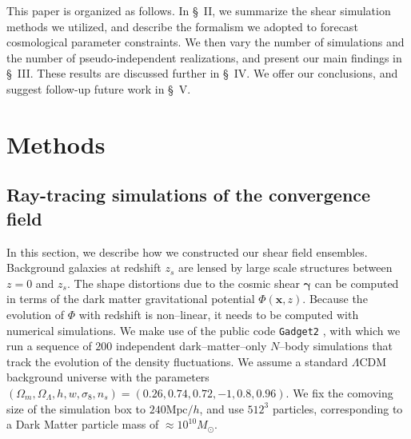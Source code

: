 \documentclass[reprint,aps,prd,superscriptaddress,showkeys,showpacs]{revtex4-1}
\newcommand{\bb}[1]{\mathbf{#1}}
\begin{document}
This paper is organized as follows.  In \S~II, we summarize the shear
simulation methods we utilized, and describe the formalism we adopted
to forecast cosmological parameter constraints. We then vary the
number of simulations and the number of pseudo-independent
realizations, and present our main findings in \S~III. These results
are discussed further in \S~IV.  We offer our conclusions, and suggest
follow-up future work in \S~V.


\section{Methods}

\subsection{Ray-tracing simulations of the convergence field}
\label{shearsim}
%
In this section, we describe how we constructed our shear field
ensembles. Background galaxies at redshift $z_s$ are lensed by large
scale structures between $z=0$ and $z_s$. The shape distortions due to
the cosmic shear $\pmb{\gamma}$ can be computed in terms of the dark
matter gravitational potential $\Phi(\bb{x},z)$. Because the evolution
of $\Phi$ with redshift is non--linear, it needs to be computed with
numerical simulations. We make use of the public code \texttt{Gadget2}
\citep{Gadget2}, with which we run a sequence of $200$ independent
dark--matter--only $N$--body simulations that track the evolution of
the density fluctuations. We assume a standard $\Lambda$CDM background
universe with the parameters
$(\Omega_m,\Omega_\Lambda,h,w,\sigma_8,n_s)=(0.26,0.74,0.72,-1,0.8,0.96)$.
We fix the comoving size of the simulation box to $240\mathrm{Mpc}/h$,
and use $512^3$ particles, corresponding to a Dark Matter particle mass of
$\approx 10^{10}M_\odot$.
\end{document}
